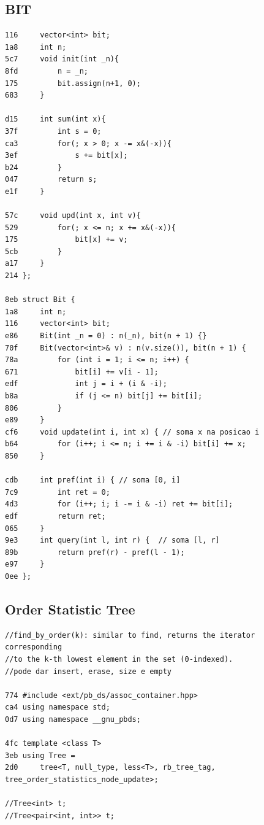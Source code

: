 \documentclass[11pt, a4paper, twoside]{article}
\begin{document}
\subsection{BIT}
\begin{lstlisting}
116     vector<int> bit;
1a8     int n;
5c7     void init(int _n){
8fd         n = _n;
175         bit.assign(n+1, 0);
683     }

d15     int sum(int x){
37f         int s = 0;
ca3         for(; x > 0; x -= x&(-x)){
3ef             s += bit[x];
b24         }
047         return s;
e1f     }

57c     void upd(int x, int v){
529         for(; x <= n; x += x&(-x)){
175             bit[x] += v;
5cb         }
a17     }
214 };
    
8eb struct Bit {
1a8 	int n;
116 	vector<int> bit;
e86 	Bit(int _n = 0) : n(_n), bit(n + 1) {}
70f 	Bit(vector<int>& v) : n(v.size()), bit(n + 1) {
78a 		for (int i = 1; i <= n; i++) {
671 			bit[i] += v[i - 1];
edf 			int j = i + (i & -i);
b8a 			if (j <= n) bit[j] += bit[i];
806 		}
e89 	}
cf6 	void update(int i, int x) { // soma x na posicao i
b64 		for (i++; i <= n; i += i & -i) bit[i] += x;
850 	}

cdb 	int pref(int i) { // soma [0, i]
7c9 		int ret = 0;
4d3 		for (i++; i; i -= i & -i) ret += bit[i];
edf 		return ret;
065 	}
9e3 	int query(int l, int r) {  // soma [l, r]
89b 		return pref(r) - pref(l - 1); 
e97 	}
0ee };
\end{lstlisting}

\subsection{Order Statistic Tree}
\begin{lstlisting}
//find_by_order(k): similar to find, returns the iterator corresponding 
//to the k-th lowest element in the set (0-indexed).
//pode dar insert, erase, size e empty

774 #include <ext/pb_ds/assoc_container.hpp>
ca4 using namespace std;
0d7 using namespace __gnu_pbds;

4fc template <class T>
3eb using Tree =
2d0     tree<T, null_type, less<T>, rb_tree_tag, tree_order_statistics_node_update>;

//Tree<int> t;
//Tree<pair<int, int>> t;
\end{lstlisting}
\end{document}
